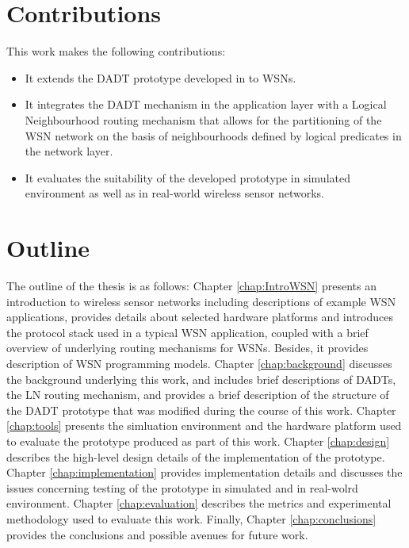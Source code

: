 \section{Contributions}

This work makes the following contributions:

\begin{itemize}
\item It extends the DADT prototype developed in \cite{migliavacca_DADT:2006} to WSNs.
\item It integrates the DADT mechanism in the application layer with a Logical
Neighbourhood \cite{mottola_LNAbstraction} routing mechanism that allows for
the partitioning of the WSN network on the basis of neighbourhoods defined by logical predicates in the network layer.
\item It evaluates the suitability of the developed prototype in simulated
environment as well as in real-world wireless sensor networks.
\end{itemize}

\section{Outline}
The outline of the thesis is as follows: Chapter \ref{chap:IntroWSN} presents an
introduction to wireless sensor networks including descriptions of example WSN
applications, provides details about selected hardware platforms and introduces
the protocol stack used in a typical WSN application, coupled with a brief overview of
underlying routing mechanisms for WSNs. Besides, it provides description of WSN
programming models. Chapter \ref{chap:background} discusses the background
underlying this work, and includes brief descriptions of DADTs, the LN routing mechanism, and provides a brief description of the structure of the DADT prototype that was modified during the course of this work. 
Chapter \ref{chap:tools} presents the simluation
environment and the hardware platform used to evaluate the prototype produced as part of this work. 
Chapter \ref{chap:design} describes the high-level design details of the
implementation of the prototype. 
Chapter \ref{chap:implementation} provides implementation details and discusses
the issues concerning testing of the prototype in simulated and in real-wolrd
environment. 
Chapter \ref{chap:evaluation} describes the metrics and experimental methodology
used to evaluate this work.
Finally, Chapter \ref{chap:conclusions} provides the conclusions and possible avenues for future work.








